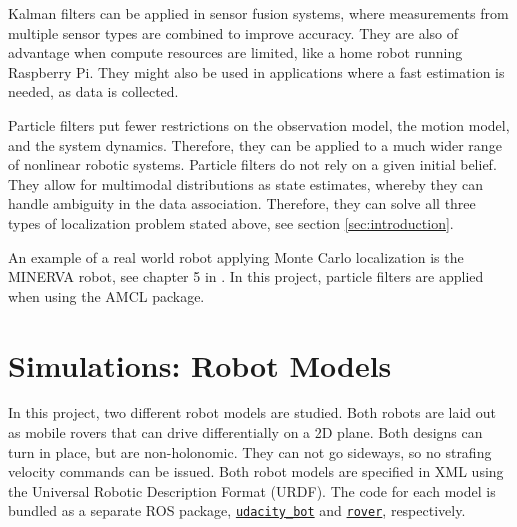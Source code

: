 \documentclass[10pt,journal,compsoc]{IEEEtran}
\begin{document}
Kalman filters can be applied in sensor fusion systems, where measurements from multiple sensor types are combined to improve accuracy. They are also of advantage when compute resources are limited, like a home robot running Raspberry Pi. They might also be used in applications where a fast estimation is needed, as data is collected.

Particle filters put fewer restrictions on the observation model, the motion model, and the system dynamics. Therefore, they can be applied to a much wider range of nonlinear robotic systems. Particle filters do not rely on a given initial belief. They allow for multimodal distributions as state estimates, whereby they can handle ambiguity in the data association. Therefore, they can solve all three types of localization problem stated above, see section \ref{sec:introduction}.

An example of a real world robot applying Monte Carlo localization is the MINERVA robot, see chapter 5 in \cite{monte_carlo_for_mobile_robots}. In this project, particle filters are applied when using the AMCL package.

\section{Simulations: Robot Models}
\label{sec:simulations_robot_models}
In this project, two different robot models are studied. Both robots are laid out as mobile rovers that can drive differentially on a 2D plane. Both designs can turn in place, but are non-holonomic. They can not go sideways, so no strafing velocity commands can be issued. Both robot models are specified in XML using the Universal Robotic Description Format (URDF). The code for each model is bundled as a separate ROS package, \href{https://github.com/S2H-Mobile/RoboND-Localization-Project/tree/master/udacity_bot}{\texttt{udacity\_bot}} and \href{https://github.com/S2H-Mobile/RoboND-Localization-Project/tree/master/rover}{\texttt{rover}}, respectively.
\end{document}
